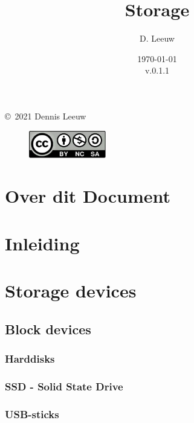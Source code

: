 \documentclass[a4paper,12pt,twoside,openright,titlepage]{book}
\author{D. Leeuw}
\title{Storage}
\date{\today\\v.0.1.1}
\begin{document}

\maketitle

\copyright\ 2021 Dennis Leeuw\\

\begin{figure}
\includegraphics[width=0.3\textwidth]{CC-BY-SA-NC.png}
\end{figure}

\bigskip




\frontmatter
\chapter{Over dit Document}



\tableofcontents

\mainmatter
\chapter{Inleiding}


\chapter{Storage devices}
\section{Block devices}
\subsection{Harddisks}
\subsection{SSD - Solid State Drive}
\subsection{USB-sticks}
\end{document}
